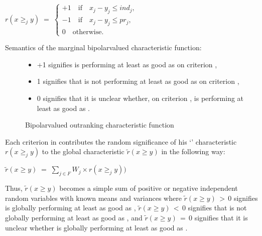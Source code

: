 \documentclass[a4paper,10pt,english]{sphinxhowto}
\let\sphinxpxdimen\pdfpxdimen\else\newdimen\sphinxpxdimen
\begin{document}
\(r(x \geq_j y) \; = \; \begin{cases} +1 \quad \text{if} \quad x_j - y_j \leq ind_j,\\  -1 \quad \text{if} \quad x_j - y_j \leq pr_j,\\ 0 \quad \text{otherwise}. \end{cases}\)
\begin{description}
\item[{Semantics of the marginal bipolar\sphinxhyphen{}valued characteristic function:}] \leavevmode\begin{itemize}
\item {} 
+1 signifies  is performing at least as good as  on
criterion ,

\item {} 
\sphinxhyphen{}1 signifies that  is not performing at least as good as  on
criterion ,

\item {} 
0 signifies that it is
unclear whether, on criterion ,  is performing at least as good as .

\end{itemize}

\end{description}

\begin{figure}[htbp]
\centering
\capstart

\noindent\sphinxincludegraphics[width=450\sphinxpxdimen]{{rCharacteristic}.png}
\caption{Bipolar\sphinxhyphen{}valued outranking characteristic function}\label{\detokenize{tutorial:rcharacteristic}}\end{figure}

Each criterion  in  contributes the random significance  of his ‘’ characteristic \(r(x \geq_j y)\) to the global characteristic \(\tilde{r}(x \geq y)\) in the following way:

\(\tilde{r}(x \geq y) \; = \; \sum_{j \in F} W_j \times r(x \geq_j y) )\)

Thus, \(\tilde{r}(x \geq y)\) becomes a simple sum of positive or negative independent random variables with known means and variances where \(\tilde{r}(x \geq y) \, > \, 0\) signifies  is globally performing at least as good as , \(\tilde{r}(x \geq y) \, < \, 0\) signifies that  is not globally performing at least as good as , and \(\tilde{r}(x \geq y)\,=\,0\) signifies that it is unclear whether  is globally performing at least as good as .
\end{document}
